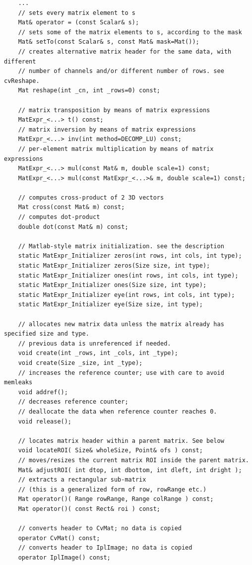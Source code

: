 \begin{lstlisting}
    ...
    // sets every matrix element to s
    Mat& operator = (const Scalar& s);
    // sets some of the matrix elements to s, according to the mask
    Mat& setTo(const Scalar& s, const Mat& mask=Mat());
    // creates alternative matrix header for the same data, with different
    // number of channels and/or different number of rows. see cvReshape.
    Mat reshape(int _cn, int _rows=0) const;

    // matrix transposition by means of matrix expressions
    MatExpr_<...> t() const;
    // matrix inversion by means of matrix expressions
    MatExpr_<...> inv(int method=DECOMP_LU) const;
    // per-element matrix multiplication by means of matrix expressions
    MatExpr_<...> mul(const Mat& m, double scale=1) const;
    MatExpr_<...> mul(const MatExpr_<...>& m, double scale=1) const;

    // computes cross-product of 2 3D vectors
    Mat cross(const Mat& m) const;
    // computes dot-product
    double dot(const Mat& m) const;

    // Matlab-style matrix initialization. see the description
    static MatExpr_Initializer zeros(int rows, int cols, int type);
    static MatExpr_Initializer zeros(Size size, int type);
    static MatExpr_Initializer ones(int rows, int cols, int type);
    static MatExpr_Initializer ones(Size size, int type);
    static MatExpr_Initializer eye(int rows, int cols, int type);
    static MatExpr_Initializer eye(Size size, int type);
    
    // allocates new matrix data unless the matrix already has specified size and type.
    // previous data is unreferenced if needed.
    void create(int _rows, int _cols, int _type);
    void create(Size _size, int _type);
    // increases the reference counter; use with care to avoid memleaks
    void addref();
    // decreases reference counter;
    // deallocate the data when reference counter reaches 0.
    void release();

    // locates matrix header within a parent matrix. See below
    void locateROI( Size& wholeSize, Point& ofs ) const;
    // moves/resizes the current matrix ROI inside the parent matrix.
    Mat& adjustROI( int dtop, int dbottom, int dleft, int dright );
    // extracts a rectangular sub-matrix
    // (this is a generalized form of row, rowRange etc.)
    Mat operator()( Range rowRange, Range colRange ) const;
    Mat operator()( const Rect& roi ) const;

    // converts header to CvMat; no data is copied
    operator CvMat() const;
    // converts header to IplImage; no data is copied
    operator IplImage() const;
    

\end{lstlisting}
